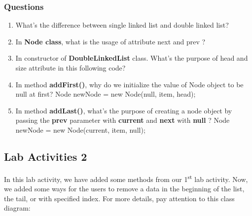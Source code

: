 \documentclass[12pt,titlepage]{article}
\begin{document}
\subsubsection{Questions}
\begin{enumerate}
    \item What’s the difference between single linked list and double linked list?
    \item In \textbf{Node class}, what is the usage of attribute next and prev ?
    \item In constructor of \textbf{DoubleLinkedList} class. What’s the purpose of head and size attribute
    in this following code?
    \item In method \textbf{addFirst()}, why do we initialize the value of Node object to be null at first?
    Node newNode = new Node(null, item, head);
    \item In method \textbf{addLast()}, what’s the purpose of creating a node object by passing the \textbf{prev} parameter with \textbf{current} and \textbf{next} with \textbf{null} ?
    Node newNode = new Node(current, item, null);
\end{enumerate}

\subsection{Lab Activities 2}
In this lab activity, we have added some methods from our 1\textsuperscript{st} lab activity. Now, we added some ways for the users to remove a data in the beginning of the list, the tail, or with specified index. For more details, pay attention to this class diagram:
\mbox{}\\
\mbox{}\\
\mbox{}\\
\end{document}
